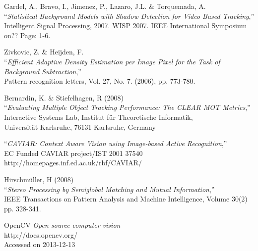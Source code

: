 \begin{thebibliography}{9}
	

	Gardel, A., Bravo, I., Jimenez, P., Lazaro, J.L. \& Torquemada, A.\\
	``\textit{Statistical Background Models with Shadow Detection for Video Based Tracking},''\\ Intelligent Signal Processing, 2007. WISP 2007. IEEE International Symposium on?? Page: 1-6.
	
	Zivkovic, Z. \& Heijden, F.\\
	``\textit{Efficient Adaptive Density Estimation per Image Pixel for the Task of Background Subtraction},''\\
	Pattern recognition letters, Vol. 27, No. 7. (2006), pp. 773-780.

	Bernardin, K. \& Stiefelhagen, R (2008)\\
	``\textit{Evaluating Multiple Object Tracking Performance: The CLEAR MOT Metrics},''\\
	Interactive Systems Lab, Institut für Theoretische Informatik,\\
	Universität Karlsruhe, 76131 Karlsruhe, Germany
	
	``\textit{CAVIAR: Context Aware Vision using Image-based Active Recognition},''\\
	EC Funded CAVIAR project/IST 2001 37540\\
	http://homepages.inf.ed.ac.uk/rbf/CAVIAR/
	
	Hirschmüller, H (2008)\\
	``\textit{Stereo Processing by Semiglobal Matching and Mutual Information},''\\
	IEEE Transactions on Pattern Analysis and Machine Intelligence, Volume 30(2)
	pp. 328-341.
	
	OpenCV \textit{Open source computer vision}\\
	http://docs.opencv.org/\\
	Accessed on 2013-12-13\\
	


\end{thebibliography}